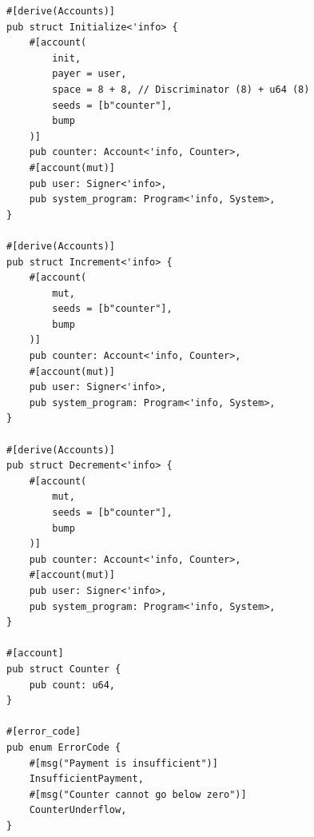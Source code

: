 \documentclass[14pt]{extreport}
\begin{document}
{\begin{lstlisting}
#[derive(Accounts)]
pub struct Initialize<'info> {
    #[account(
        init,
        payer = user,
        space = 8 + 8, // Discriminator (8) + u64 (8)
        seeds = [b"counter"],
        bump
    )]
    pub counter: Account<'info, Counter>,
    #[account(mut)]
    pub user: Signer<'info>,
    pub system_program: Program<'info, System>,
}

#[derive(Accounts)]
pub struct Increment<'info> {
    #[account(
        mut,
        seeds = [b"counter"],
        bump
    )]
    pub counter: Account<'info, Counter>,
    #[account(mut)]
    pub user: Signer<'info>,
    pub system_program: Program<'info, System>,
}

#[derive(Accounts)]
pub struct Decrement<'info> {
    #[account(
        mut,
        seeds = [b"counter"],
        bump
    )]
    pub counter: Account<'info, Counter>,
    #[account(mut)]
    pub user: Signer<'info>,
    pub system_program: Program<'info, System>,
}

#[account]
pub struct Counter {
    pub count: u64,
}

#[error_code]
pub enum ErrorCode {
    #[msg("Payment is insufficient")]
    InsufficientPayment,
    #[msg("Counter cannot go below zero")]
    CounterUnderflow,
}
\end{lstlisting}
}
\end{document}
